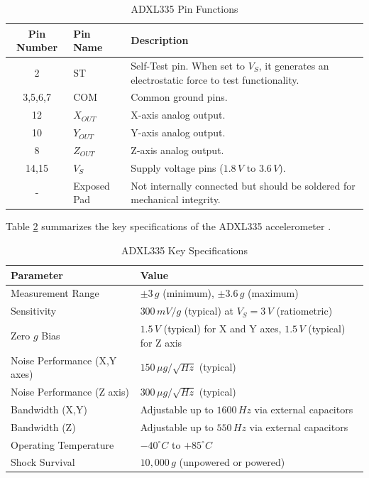 {	\begin{table}[h]
		\centering
		\caption{ADXL335 Pin Functions \cite{ADXL335}}
		\label{tab:pins}
		\begin{tabular}{|c|l|p{7cm}|}
			\hline
			\textbf{Pin Number} & \textbf{Pin Name} & \textbf{Description} \\ \hline
			2 & ST & Self-Test pin. When set to $V_S$, it generates an electrostatic force to test functionality. \\ \hline
			3,5,6,7 & COM & Common ground pins. \\ \hline
			12 & $X_{OUT}$ & X-axis analog output. \\ \hline
			10 & $Y_{OUT}$ & Y-axis analog output. \\ \hline
			8 & $Z_{OUT}$ & Z-axis analog output. \\ \hline
			14,15 & $V_S$ & Supply voltage pins ($1.8\,V$ to $3.6\,V$). \\ \hline
			- & Exposed Pad & Not internally connected but should be soldered for mechanical integrity. \\ \hline
		\end{tabular}
	\end{table}
	
	Table \ref{tab:specs} summarizes the key specifications of the ADXL335 accelerometer \cite{ADXL335}.
	
	\begin{table}[h]
		\centering
		\caption{ADXL335 Key Specifications \cite{ADXL335}}
		\label{tab:specs}
		\begin{tabular}{|l|l|}
			\hline
			\textbf{Parameter} & \textbf{Value} \\ \hline
			Measurement Range & $\pm3\,g$ (minimum), $\pm3.6\,g$ (maximum) \\ \hline
			Sensitivity & $300\,mV/g$ (typical) at $V_S = 3\,V$ (ratiometric) \\ \hline
			Zero $g$ Bias & $1.5\,V$ (typical) for X and Y axes, $1.5\,V$ (typical) for Z axis \\ \hline
			Noise Performance (X,Y axes) & $150\,\mu g/\sqrt{Hz}$ (typical) \\ \hline
			Noise Performance (Z axis) & $300\,\mu g/\sqrt{Hz}$ (typical) \\ \hline
			Bandwidth (X,Y) & Adjustable up to $1600\,Hz$ via external capacitors \\ \hline
			Bandwidth (Z) & Adjustable up to $550\,Hz$ via external capacitors \\ \hline
			Operating Temperature & $-40^\circ C$ to $+85^\circ C$ \\ \hline
			Shock Survival & $10,000\,g$ (unpowered or powered) \\ \hline
		\end{tabular}
	\end{table}
	
}
